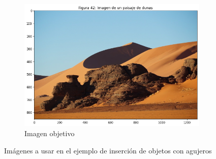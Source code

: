\documentclass[11pt,twoside,titlepage,a4paper]{article}
\numberwithin{equation}{section} %
\theoremstyle{usual}
\begin{document}
\begin{figure}[h]
\begin{subfigure}[t]{.45\textwidth}
        \includegraphics[width=\textwidth]{imagenes/PoissonImageEditing_cell_56_output_1.png}
        \caption{Imagen objetivo}
    \end{subfigure}
    \caption{Imágenes a usar en el ejemplo de inserción de objetos con agujeros}
    \label{fig:imagenesUsadasInsercionCerca}
\end{figure}

\end{document}
